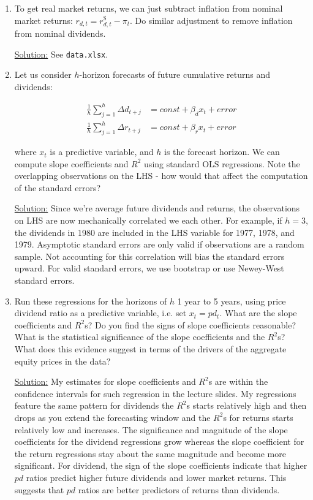\documentclass{article}
\begin{document}
\begin{enumerate}

\item To get real market returns, we can just subtract inflation from nominal market returns: $r_{d,t} = r^{\$}_{d,t} - \pi_t$. Do similar adjustment to remove inflation from nominal dividends.

\bigskip

\underline{Solution:} See \texttt{data.xlsx}.

\bigskip

\item Let us consider $h$-horizon forecasts of future cumulative returns and dividends:

\begin{align*}
\frac{1}{h} \sum_{j=1}^h \Delta d_{t+j} &= const + \beta_d x_t + error \\
\frac{1}{h} \sum_{j=1}^h \Delta r_{t+j} &= const + \beta_r x_t + error
\end{align*}

where $x_t$ is a predictive variable, and $h$ is the forecast horizon. We can compute slope coefficients and $R^2$ using standard OLS regressions.  Note the overlapping observations on the LHS - how would that affect the computation of the standard errors?

\bigskip

\underline{Solution:} Since we're average future dividends and returns, the observations on LHS are now mechanically correlated we each other.  For example, if $h=3$, the dividends in 1980 are included in the LHS variable for 1977, 1978, and 1979.  Asymptotic standard errors are only valid if observations are a random sample. Not accounting for this correlation will bias the standard errors upward.  For valid standard errors, we use bootstrap or use Newey-West standard errors.

\pagebreak

\item Run these regressions for the horizons of $h$ 1 year to 5 years, using price dividend ratio as a predictive variable, i.e. set $x_t = pd_t$. What are the slope coefficients and $R^2$s? Do you find the signs of slope coefficients reasonable? What is the statistical significance of the slope coefficients and the $R^2$s? What does this evidence suggest in terms of the drivers of the aggregate equity prices in the data?

\bigskip

\underline{Solution:} My estimates for slope coefficients and $R^2$s are within the confidence intervals for such regression in the lecture slides.  My regressions feature the same pattern for dividends the $R^2$s starts relatively high and then drops as you extend the forecasting window and the $R^2$s for returns starts relatively low and increases. The significance and magnitude of the slope coefficients for the dividend regressions grow whereas the slope coefficient for the return regressions stay about the same magnitude and become more significant. For dividend, the sign of the slope coefficients indicate that higher $pd$ ratios predict higher future dividends and lower market returns.  This suggests that $pd$ ratios are better predictors of returns than dividends.


\end{enumerate}
\end{document}
